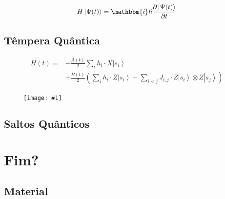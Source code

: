 \documentclass{beamer}
\newcommand{\ket}[1]{\ensuremath{\left|#1\right\rangle}}
\newcommand{\imgw}[2]{%
\begin{center}
	\begin{figure}
	\texttt{[image: \#1]}\\
	\end{figure}
\end{center}
}
\begin{document}
	\begin{frame}{\subsecname}
		
		\begin{align*}
			H \ket{\Psi(t)} =\mathbbm{i} \hslash \frac{\partial \ket{\Psi(t)}}{\partial t}
		\end{align*}
	\end{frame}
	
	\begin{frame}{\subsecname}
	
	\end{frame}	
	
	\begin{frame}{\subsecname}
	
	\end{frame}
	
	\begin{frame}{\subsecname}
	
	\end{frame}
	
	\subsection{Têmpera Quântica}	
	
	\begin{frame}{\subsecname}
		\begin{align*}
			H(t) = &-\frac{A(t)}{2}  \sum_{i} h_i \cdot X\ket{s_i}\\ &+ \frac{B(t)}{2}\left(\sum_{i} h_i \cdot Z\ket{s_i} + \sum_{i < j} J_{i,j} \cdot Z\ket{s_i} \otimes Z\ket{s_j}\right)
		\end{align*}
	\end{frame}
	
	\begin{frame}{\subsecname}
		\imgw{energy-levels.pdf}{7cm}
	\end{frame}
	
	\subsection{Saltos Quânticos}
	
	\begin{frame}
	
	\end{frame}	
	
	\section{Fim?}

	
	\subsection{Material}
	
\end{document}
